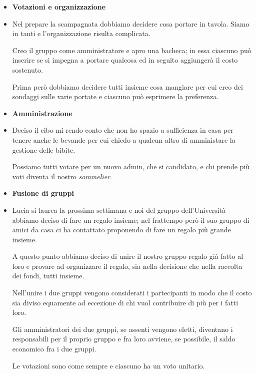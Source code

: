 \documentclass[11pt]{beamer}
\begin{document}
	\begin{frame}
		\begin{itemize}
			\item \textbf{Votazioni e organizzazione}
			
			\item[] Nel prepare la scampagnata dobbiamo decidere cosa portare in tavola. Siamo in tanti e l'organizzazione risulta complicata.
			
			Creo il gruppo come amministratore e apro una bacheca; in essa ciascuno può inserire se si impegna a portare qualcosa ed in seguito aggiungerà il costo sostenuto.
			
			Prima però dobbiamo decidere tutti insieme cosa mangiare per cui creo dei sondaggi sulle varie portate e ciascuno può esprimere la preferenza.
			
			\item \textbf{Amministrazione}
			
			\item[] Deciso il cibo mi rendo conto che non ho spazio a sufficienza in casa per tenere anche le bevande per cui chiedo a qualcun altro di amministare la gestione delle bibite.
			
			Possiamo tutti votare per un nuovo admin, che si candidato, e chi prende più voti diventa il nostro \textit{sommelier}.
		\end{itemize}
	\end{frame}

	\begin{frame}
		\begin{itemize}
			\item \textbf{Fusione di gruppi}
			
			\item[] Lucia si laurea la prossima settimana e noi del gruppo dell'Università abbiamo deciso di fare un regalo insieme; nel frattempo però il suo gruppo di amici da casa ci ha contattato proponendo di fare un regalo più grande insieme.
			
			A questo punto abbiamo deciso di unire il nostro gruppo regalo già fatto al loro e provare ad organizzare il regalo, sia nella decisione che nella raccolta dei fondi, tutti insieme.
			
			Nell'unire i due gruppi vengono considerati i partecipanti in modo che il costo sia diviso equamente ad eccezione di chi vuol contribuire di più per i fatti loro.
			
			Gli amministratori dei due gruppi, se assenti vengono eletti, diventano i responsabili per il proprio gruppo e fra loro avviene, se possibile, il saldo economico fra i due gruppi.
			
			Le votazioni sono come sempre e ciascuno ha un voto unitario.
		\end{itemize}
	\end{frame}
	
\end{document}
